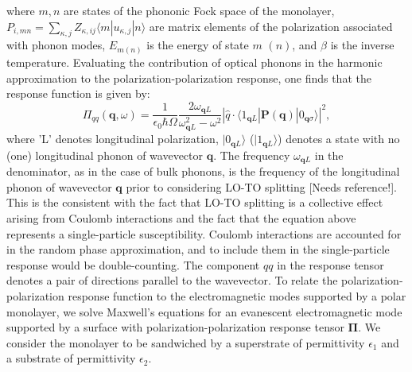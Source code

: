 \documentclass[aps,prb,twocolumn,
	groupedaddress,superscriptaddress,
	amsfonts,amssymb,amsmath,floatfix,
	citeautoscript]{revtex4-1}
\begin{document}
where $m,n$ are states of the phononic Fock space of the monolayer, $P_{i,mn} = \sum\limits_{\kappa,j}Z_{\kappa,ij}\langle m | u_{\kappa,j} | n \rangle$ are matrix elements of the polarization associated with phonon modes, $E_{m (n)}$ is the energy of state $m$ $(n)$, and $\beta$ is the inverse temperature. Evaluating the contribution of optical phonons in the harmonic approximation to the polarization-polarization response, one finds that the response function is given by: 
\begin{equation}
\Pi_{qq}(\mathbf{q},\omega) = \frac{1}{\epsilon_0\hbar\Omega} \frac{2\omega_{\mathbf{q}L}}{\omega^2_{\mathbf{q}L}-\omega^2}|\hat{q}\cdot\langle 1_{\mathbf{q}L}|\mathbf{P}(\mathbf{q})|0_{\mathbf{q}\sigma}\rangle|^2,
\end{equation}
where 'L' denotes longitudinal polarization, $|0_{\mathbf{q}L}\rangle$ ($|1_{\mathbf{q}L}\rangle$) denotes a state with no (one) longitudinal phonon of wavevector $\mathbf{q}$. The frequency $\omega_{\mathbf{q}L}$ in the denominator, as in the case of bulk phonons, is the frequency of the longitudinal phonon of wavevector $\mathbf{q}$ prior to considering LO-TO splitting [Needs reference!]. This is the consistent with the fact that LO-TO splitting is a collective effect arising from Coulomb interactions and the fact that the equation above represents a single-particle susceptibility. Coulomb interactions are accounted for in the random phase approximation, and to include them in the single-particle response would be double-counting. The component $qq$ in the response tensor denotes a pair of directions parallel to the wavevector.  
To relate the polarization-polarization response function to the electromagnetic modes supported by a polar monolayer, we solve Maxwell's equations for an evanescent electromagnetic mode supported by a surface with polarization-polarization response tensor $\mathbf{\Pi}$. We consider the monolayer to be sandwiched by a superstrate of permittivity $\epsilon_1$ and a substrate of permittivity $\epsilon_2$.
\end{document}
